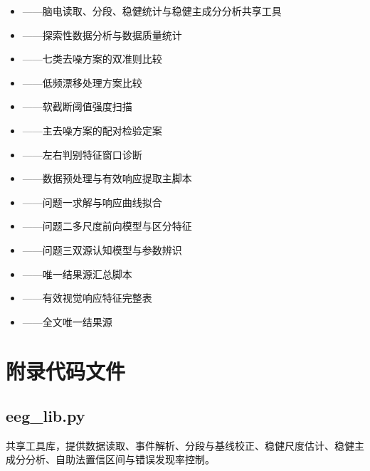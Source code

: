 \documentclass[bwprint]{gmcmthesis}
\begin{document}
\begin{appendices}
\newcommand{\AppendixCodeName}[1]{#1}

\begin{itemize}[label={},leftmargin=1.9em,itemsep=0.25em,topsep=0.25em]
    \item \textbf{}——脑电读取、分段、稳健统计与稳健主成分分析共享工具
    \item \textbf{}——探索性数据分析与数据质量统计
    \item \textbf{}——七类去噪方案的双准则比较
    \item \textbf{}——低频漂移处理方案比较
    \item \textbf{}——软截断阈值强度扫描
    \item \textbf{}——主去噪方案的配对检验定案
    \item \textbf{}——左右判别特征窗口诊断
    \item \textbf{}——数据预处理与有效响应提取主脚本
    \item \textbf{}——问题一求解与响应曲线拟合
    \item \textbf{}——问题二多尺度前向模型与区分特征
    \item \textbf{}——问题三双源认知模型与参数辨识
    \item \textbf{}——唯一结果源汇总脚本
    \item \textbf{}——有效视觉响应特征完整表
    \item \textbf{}——全文唯一结果源
\end{itemize}

\section{附录代码文件}

\subsection{eeg\_lib.py}


共享工具库，提供数据读取、事件解析、分段与基线校正、稳健尺度估计、稳健主成分分析、自助法置信区间与错误发现率控制。


\end{appendices}
\end{document}
